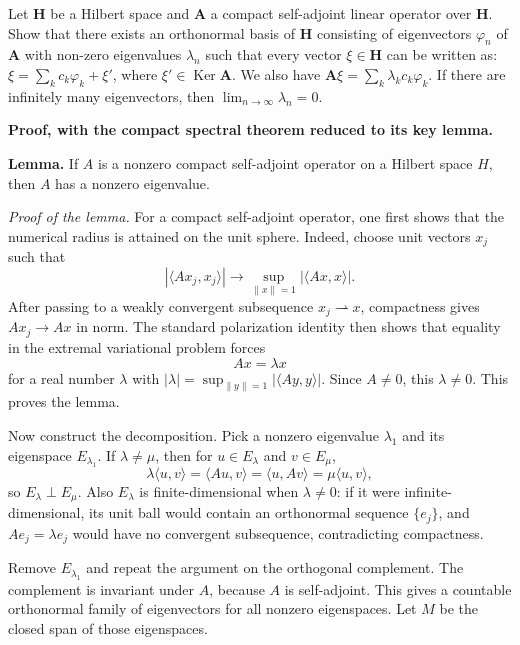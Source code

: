 \begin{exercise}
\label{analysis:2013:11}
Let $\mathbf{H}$ be a Hilbert space and $\mathbf{A}$ a compact self-adjoint linear operator over $\mathbf{H}$. Show that there exists an orthonormal basis of $\mathbf{H}$ consisting of eigenvectors $\varphi_n$ of $\mathbf{A}$ with non-zero eigenvalues $\lambda_n$ such that every vector $\xi \in \mathbf{H}$ can be written as: $\xi = \sum_k c_k \varphi_k + \xi'$, where $\xi' \in \operatorname{Ker} \mathbf{A}$. We also have $\mathbf{A}\xi = \sum_k \lambda_k c_k \varphi_k$. If there are infinitely many eigenvectors, then $\lim_{n \to \infty} \lambda_n = 0$.
\end{exercise}

\begin{solution}
\textbf{Proof, with the compact spectral theorem reduced to its key lemma.}

\textbf{Lemma.}
If \(A\) is a nonzero compact self-adjoint operator on a Hilbert space \(H\), then \(A\) has a nonzero eigenvalue.

\textit{Proof of the lemma.}
For a compact self-adjoint operator, one first shows that the numerical radius is attained on the unit sphere. Indeed, choose unit vectors \(x_j\) such that
\[
|\langle Ax_j,x_j\rangle|\to
\sup_{\|x\|=1}|\langle Ax,x\rangle|.
\]
After passing to a weakly convergent subsequence \(x_j\rightharpoonup x\), compactness gives \(Ax_j\to Ax\) in norm. The standard polarization identity then shows that equality in the extremal variational problem forces
\[
Ax=\lambda x
\]
for a real number \(\lambda\) with \(|\lambda|=\sup_{\|y\|=1}|\langle Ay,y\rangle|\). Since \(A\neq0\), this \(\lambda\neq0\). This proves the lemma.

Now construct the decomposition. Pick a nonzero eigenvalue \(\lambda_1\) and its eigenspace \(E_{\lambda_1}\). If \(\lambda\neq\mu\), then for \(u\in E_\lambda\) and \(v\in E_\mu\),
\[
\lambda\langle u,v\rangle
=\langle Au,v\rangle
=\langle u,Av\rangle
=\mu\langle u,v\rangle,
\]
so \(E_\lambda\perp E_\mu\). Also \(E_\lambda\) is finite-dimensional when \(\lambda\neq0\): if it were infinite-dimensional, its unit ball would contain an orthonormal sequence \(\{e_j\}\), and \(Ae_j=\lambda e_j\) would have no convergent subsequence, contradicting compactness.

Remove \(E_{\lambda_1}\) and repeat the argument on the orthogonal complement. The complement is invariant under \(A\), because \(A\) is self-adjoint. This gives a countable orthonormal family of eigenvectors for all nonzero eigenspaces. Let \(M\) be the closed span of those eigenspaces.


\end{solution}
